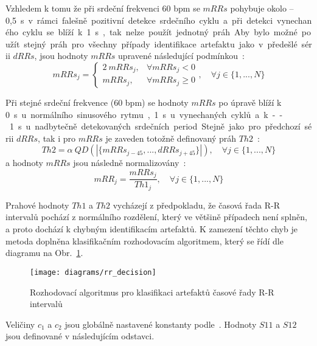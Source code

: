 Vzhledem k tomu že při srdeční frekvenci 60 bpm se $mRRs$ pohybuje okolo
--0,5~\si\s~v rámci falešně pozitivní detekce srdečního cyklu a při detekci
vynechaného cyklu se blíží k 1~\si\s, tak nelze použít jednotný práh. Aby bylo
možné použít stejný práh pro všechny případy identifikace artefaktu jako v
předešlé sérii $dRRs$, jsou hodnoty $mRRs$ upravené následující
podmínkou~\cite{Lipponen2019}:
\begin{equation}
    mRRs_j =
    \begin{cases}
        2~mRRs_j, & \forall mRRs_j < 0    \\
        mRRs_j,   & \forall mRRs_j \geq 0
    \end{cases}
    , \quad \forall j \in \{1,...,N\}
\end{equation}

Při stejné srdeční frekvence (60 bpm) se hodnoty $mRRs$ po úpravě blíží k
0~\si\s~u normálního sinusového rytmu, 1~\si\s~ u vynechaných cyklů a k
--1~\si\s~ u nadbytečně detekovaných srdečních period. Stejně jako pro předchozí
sérii $dRRs$, tak i pro $mRRs$ je zaveden totožně definovaný práh
$Th2$~\cite{Lipponen2019}:
\begin{equation}
    Th2 = \alpha~QD(|\{mRRs_{j-45},...,dRRs_{j+45}\}|), \quad \forall j \in \{1,...,N\}
\end{equation}
a hodnoty $mRRs$ jsou následně normalizovány~\cite{Lipponen2019}:
\begin{equation}
    mRR_j = \frac{mRRs_j}{Th1_j}, \quad \forall j \in \{1,...,N\}
\end{equation}

Prahové hodnoty $Th1$ a $Th2$ vycházejí z předpokladu, že časová řada R-R
intervalů pochází z normálního rozdělení, který ve většině případech není
splněn, a proto dochází k chybným identifikacím artefaktů. K zamezení těchto
chyb je metoda doplněna klasifikačním rozhodovacím algoritmem, který se řídí dle
diagramu na Obr.~\ref{fig:rr_decision}.

\begin{figure}[h]
    \begin{center}
        \texttt{[image: diagrams/rr\_decision]}
        \caption{Rozhodovací algoritmus pro klasifikaci artefaktů časové řady R-R intervalů~\cite{Lipponen2019}}
        \label{fig:rr_decision}
    \end{center}
\end{figure}

Veličiny $c_1$ a $c_2$ jsou globálně nastavené konstanty
podle~\cite{Lipponen2019}. Hodnoty $S11$ a $S12$ jsou definované v následujícím
odstavci.

